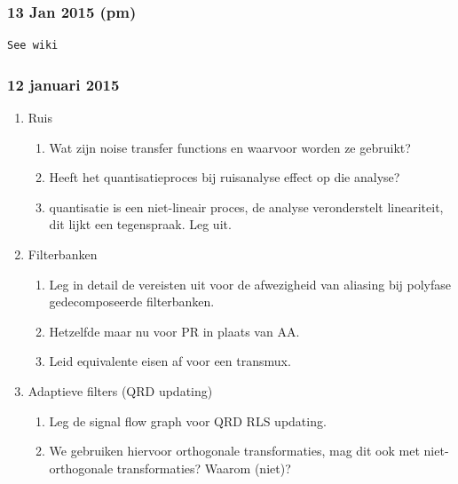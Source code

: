 \documentclass[
  a4paper,
  ,captions=tableheading
]{scrartcl}
\providecommand{\tightlist}{%
  \setlength{\itemsep}{0pt}\setlength{\parskip}{0pt}}
\begin{document}
\subsubsection{\texorpdfstring{\textbf{13 Jan 2015
(pm)}}{13 Jan 2015 (pm)}}\label{jan-2015-pm}

\begin{lstlisting}
See wiki
\end{lstlisting}

\subsubsection{\texorpdfstring{\textbf{12 januari
2015}}{12 januari 2015}}\label{januari-2015}

\begin{enumerate}
\def\labelenumi{\arabic{enumi}.}
\tightlist
\item
  Ruis

  \begin{enumerate}
  \def\labelenumii{\arabic{enumii}.}
  \tightlist
  \item
    Wat zijn noise transfer functions en waarvoor worden ze gebruikt?\\
  \item
    Heeft het quantisatieproces bij ruisanalyse effect op die analyse?\\
  \item
    quantisatie is een niet-lineair proces, de analyse veronderstelt
    lineariteit, dit lijkt een tegenspraak. Leg uit.\\
  \end{enumerate}
\item
  Filterbanken

  \begin{enumerate}
  \def\labelenumii{\arabic{enumii}.}
  \tightlist
  \item
    Leg in detail de vereisten uit voor de afwezigheid van aliasing bij
    polyfase gedecomposeerde filterbanken.\\
  \item
    Hetzelfde maar nu voor PR in plaats van AA.\\
  \item
    Leid equivalente eisen af voor een transmux.\\
  \end{enumerate}
\item
  Adaptieve filters (QRD updating)

  \begin{enumerate}
  \def\labelenumii{\arabic{enumii}.}
  \tightlist
  \item
    Leg de signal flow graph voor QRD RLS updating.\\
  \item
    We gebruiken hiervoor orthogonale transformaties, mag dit ook met
    niet-orthogonale transformaties? Waarom (niet)?
  \end{enumerate}
\end{enumerate}
\end{document}
